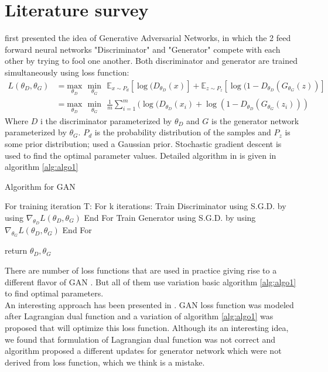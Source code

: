 \documentclass{article}
\begin{document}
\section{Literature survey}
\cite{goodfellow_generative_2014} first presented the idea of Generative Adversarial Networks, in which the 2 feed forward neural networks "Discriminator" and "Generator" compete with each other by trying to fool one another. Both discriminator and generator are trained simultaneously using loss function:
\begin{align}
L(\theta_D,\theta_G)&=\underset{\theta_D}{\text{max}} \text{  }\underset{\theta_G}{\text{min}}\text{  }\mathbb{E}_{x \sim P_{d}}[\log(D_{\theta_D}(x)]+ \mathbb{E}_{z\sim P_{z}}[\log(1-D_{\theta_D}(G_{\theta_G}(z))]\\
&=\underset{\theta_D}{\text{max}} \text{  }\underset{\theta_G}{\text{min}}\text{  }\frac{1}{m}\sum_{i=1}^{m}(\log(D_{\theta_D}(x_i)+\log(1-D_{\theta_D}(G_{\theta_G}(z_i)))
\end{align}
Where $D$ i the discriminator parameterized by $\theta_D$ and $G$ is the generator network parameterized by $\theta_G$. $P_d$ is the probability distribution of the samples and $P_z$ is some prior distribution; \cite{goodfellow_generative_2014} used  a Gaussian prior. Stochastic gradient descent is used to find the optimal parameter values. Detailed algorithm in  \cite{goodfellow_generative_2014} is given in algorithm \ref{alg:algo1}
\begin{algorithm}
\caption{Algorithm for GAN}
\label{alg:algo1}
\begin{algorithmic}[1]
\State For training iteration T:
\State For k iterations:
\State Train Discriminator using  S.G.D. by using $\nabla_{\theta_D} L(\theta_D,\theta_G)$
\State End For
\State Train Generator using  S.G.D. by using $\nabla_{\theta_G} L(\theta_D,\theta_G)$
\State End For

\State return $\theta_D,\theta_G$
\end{algorithmic}
\end{algorithm}
There are number of loss functions that are used in practice giving rise to a different flavor of GAN \cite{arjovsky_wasserstein_2017,nowozin_f-gan:_2016,radford_unsupervised_2015}. But all of them use variation basic algorithm \ref{alg:algo1} to find optimal parameters. \\
An interesting approach has been presented in \cite{chen_training_2018}. GAN loss function was modeled after Lagrangian dual function and a variation of algorithm \ref{alg:algo1}  was proposed that will optimize this loss function. Although its an interesting idea, we found that formulation of Lagrangian dual function was not correct and algorithm proposed a different updates for generator network which were not derived from loss function, which we think is a mistake.\\\\
\end{document}
